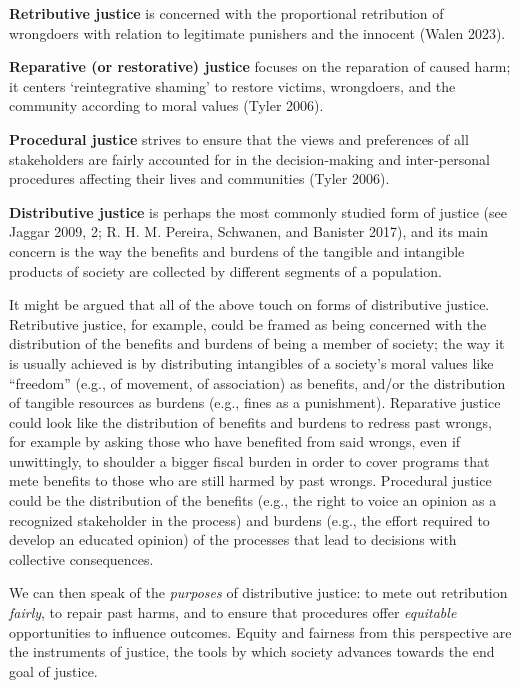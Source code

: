 \documentclass[12pt, oneside]{report}
\begin{document}
\textbf{Retributive justice} is concerned with the proportional
retribution of wrongdoers with relation to legitimate punishers and the
innocent (Walen 2023).

\textbf{Reparative (or restorative) justice} focuses on the reparation
of caused harm; it centers `reintegrative shaming' to restore victims,
wrongdoers, and the community according to moral values (Tyler 2006).

\textbf{Procedural justice} strives to ensure that the views and
preferences of all stakeholders are fairly accounted for in the
decision-making and inter-personal procedures affecting their lives and
communities (Tyler 2006).

\textbf{Distributive justice} is perhaps the most commonly studied form
of justice (see Jaggar 2009, 2; R. H. M. Pereira, Schwanen, and Banister
2017), and its main concern is the way the benefits and burdens of the
tangible and intangible products of society are collected by different
segments of a population.

It might be argued that all of the above touch on forms of distributive
justice. Retributive justice, for example, could be framed as being
concerned with the distribution of the benefits and burdens of being a
member of society; the way it is usually achieved is by distributing
intangibles of a society's moral values like ``freedom'' (e.g., of
movement, of association) as benefits, and/or the distribution of
tangible resources as burdens (e.g., fines as a punishment). Reparative
justice could look like the distribution of benefits and burdens to
redress past wrongs, for example by asking those who have benefited from
said wrongs, even if unwittingly, to shoulder a bigger fiscal burden in
order to cover programs that mete benefits to those who are still harmed
by past wrongs. Procedural justice could be the distribution of the
benefits (e.g., the right to voice an opinion as a recognized
stakeholder in the process) and burdens (e.g., the effort required to
develop an educated opinion) of the processes that lead to decisions
with collective consequences.

We can then speak of the \emph{purposes} of distributive justice: to
mete out retribution \emph{fairly}, to repair past harms, and to ensure
that procedures offer \emph{equitable} opportunities to influence
outcomes. Equity and fairness from this perspective are the instruments
of justice, the tools by which society advances towards the end goal of
justice.
\end{document}
